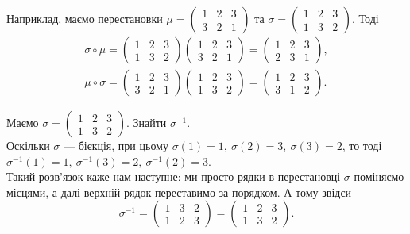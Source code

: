 \documentclass{math_library}
\begin{document}
\begin{example}
Наприклад, маємо перестановки $\mu = \begin{pmatrix}
1 & 2 & 3 \\
3 & 2 & 1
\end{pmatrix}$ та $\sigma = \begin{pmatrix}
1 & 2 & 3 \\
1 & 3 & 2
\end{pmatrix}$. Тоді
\begin{align*}
\sigma \circ \mu = \begin{pmatrix}
1 & 2 & 3 \\
1 & 3 & 2
\end{pmatrix} \begin{pmatrix}
1 & 2 & 3 \\
3 & 2 & 1
\end{pmatrix} = \begin{pmatrix}
1 & 2 & 3 \\
2 & 3 & 1
\end{pmatrix}, \\
\mu \circ \sigma = \begin{pmatrix}
1 & 2 & 3 \\
3 & 2 & 1
\end{pmatrix} \begin{pmatrix}
1 & 2 & 3 \\
1 & 3 & 2
\end{pmatrix} = \begin{pmatrix}
1 & 2 & 3 \\
3 & 1 & 2
\end{pmatrix}.
\end{align*}
\end{example}

\begin{example}
Маємо $\sigma = \begin{pmatrix}
1 & 2 & 3 \\
1 & 3 & 2
\end{pmatrix}$. Знайти $\sigma^{-1}$.
\bigskip \\
Оскільки $\sigma$ --- бієкція, при цьому $\sigma(1) = 1,\ \sigma(2) = 3,\ \sigma(3) = 2$, то тоді $\sigma^{-1}(1) = 1,\ \sigma^{-1}(3) = 2,\ \sigma^{-1}(2) = 3$. \\
Такий розв'язок каже нам наступне: ми просто рядки в перестановці $\sigma$ поміняємо місцями, а далі верхній рядок переставимо за порядком. А тому звідси
\[
\sigma^{-1} = \begin{pmatrix}
1 & 3 & 2 \\
1 & 2 & 3
\end{pmatrix} = \begin{pmatrix}
1 & 2 & 3 \\
1 & 3 & 2
\end{pmatrix}.
\]
\end{example}
\end{document}
